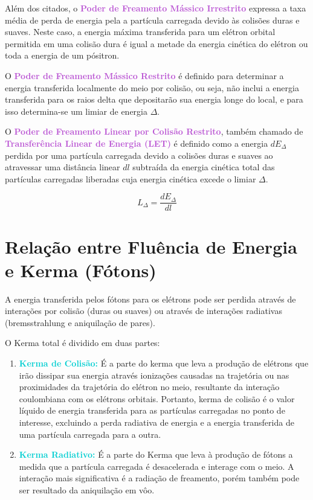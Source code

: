 \documentclass[11pt,a4paper]{article}
\begin{document}
		Além dos citados, o \textcolor{MediumOrchid}{\textbf{Poder de Freamento Mássico Irrestrito}} expressa a taxa média de perda de energia pela a partícula carregada devido às colisões duras e suaves. Neste caso, a energia máxima transferida para um elétron orbital permitida em uma colisão dura é igual a metade da energia cinética do elétron ou toda a energia de um pósitron. 


		O \textcolor{MediumOrchid}{\textbf{Poder de Freamento Mássico Restrito}} é definido para determinar a energia transferida localmente do meio por colisão, ou seja, não inclui a energia transferida para os raios delta que depositarão sua energia longe do local, e para isso determina-se um limiar de energia $\Delta$.

		O \textcolor{MediumOrchid}{\textbf{Poder de Freamento Linear por Colisão Restrito}}, também chamado de \textcolor{MediumOrchid}{\textbf{Transferência Linear de Energia (LET)}} é definido como a energia $dE_\Delta$ perdida por uma partícula carregada devido a colisões duras e suaves  ao atravessar uma distância linear $dl$ subtraída da energia cinética total das partículas carregadas liberadas cuja energia cinética excede o limiar $\Delta$.

			\begin{equation}
				L_\Delta = \frac{dE_\Delta}{dl}
			\end{equation}
	
		
	\section{Relação entre Fluência de Energia e Kerma (Fótons)}

		A energia transferida pelos fótons para os elétrons pode ser perdida através de interações por colisão (duras ou suaves) ou através de interações radiativas (bremsstrahlung e aniquilação de pares). 
		
		O Kerma total é dividido em duas partes:

		\begin{enumerate}
			\item \textcolor{DarkTurquoise}{\textbf{Kerma de Colisão:}} É a parte do kerma que leva a produção de elétrons que irão dissipar sua energia através ionizações causadas na trajetória ou nas proximidades da trajetória do elétron no meio, resultante da interação coulombiana com os elétrons orbitais. Portanto, kerma de colisão é o valor líquido de energia transferida para as partículas carregadas no ponto de interesse, excluindo a perda radiativa de energia e a energia transferida de uma partícula carregada para a outra.
			
			\item \textcolor{DarkTurquoise}{\textbf{Kerma Radiativo:}} É a parte do Kerma que leva à produção de fótons a medida que a partícula carregada é desacelerada e interage com o meio. A interação mais significativa é a radiação de freamento, porém também pode ser resultado da aniquilação em vôo.
		\end{enumerate}
\end{document}
